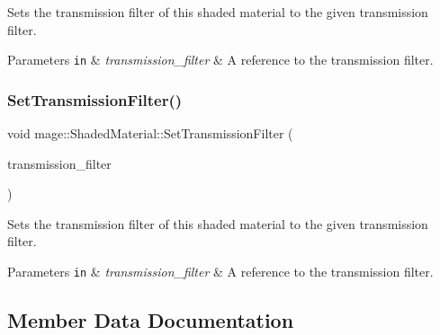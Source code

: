 Sets the transmission filter of this shaded material to the given transmission filter.


\begin{DoxyParams}[1]{Parameters}
\mbox{\tt in}  & {\em transmission\+\_\+filter} & A reference to the transmission filter. \\
\hline
\end{DoxyParams}
\hypertarget{structmage_1_1_shaded_material_a431b82b0149bda7229ba2d12123e4315}{}\label{structmage_1_1_shaded_material_a431b82b0149bda7229ba2d12123e4315} 
\subsubsection{\texorpdfstring{Set\+Transmission\+Filter()}{SetTransmissionFilter()}\hspace{0.1cm}{\footnotesize\ttfamily [2/2]}}
{\footnotesize\ttfamily void mage\+::\+Shaded\+Material\+::\+Set\+Transmission\+Filter (\begin{DoxyParamCaption}\item[{\hyperlink{structmage_1_1_r_g_b_spectrum}{R\+G\+B\+Spectrum} \&\&}]{transmission\+\_\+filter }\end{DoxyParamCaption})}

Sets the transmission filter of this shaded material to the given transmission filter.


\begin{DoxyParams}[1]{Parameters}
\mbox{\tt in}  & {\em transmission\+\_\+filter} & A reference to the transmission filter. \\
\hline
\end{DoxyParams}


\subsection{Member Data Documentation}
\hypertarget{structmage_1_1_shaded_material_a744f6e4c0318f29f343039d6be072b66}{}\label{structmage_1_1_shaded_material_a744f6e4c0318f29f343039d6be072b66} 
